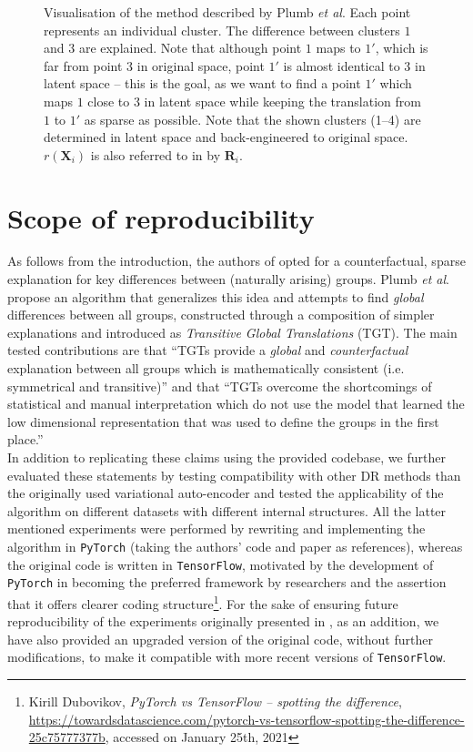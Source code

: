 \begin{figure}[h]
  \scalebox{0.75}{}
  \caption{Visualisation of the method described by Plumb \textit{et al}. Each point represents an individual cluster. The difference between clusters $1$ and $3$ are explained. Note that although point $1$ maps to $1'$, which is far from point $3$ in original space, point $1'$ is almost identical to $3$ in latent space -- this is the goal, as we want to find a point $1'$ which maps $1$ close to $3$ in latent space while keeping the translation from $1$ to $1'$ as sparse as possible. Note that the shown clusters (1--4) are determined in latent space and back-engineered to original space. $r(\boldsymbol{X}_i)$ is also referred to in \cite{plumb2020explaining} by $\boldsymbol{R}_i$.}
\end{figure}

\section{Scope of reproducibility}
As follows from the introduction, the authors of \cite{plumb2020explaining} opted for a counterfactual, sparse explanation for key differences between (naturally arising) groups. Plumb \textit{et al}. propose an algorithm that generalizes this idea and attempts to find \textit{global} differences between all groups, constructed through a composition of simpler explanations and introduced as \textit{Transitive Global Translations} (TGT). The main tested contributions are that ``TGTs provide a \textit{global} and \textit{counterfactual} explanation between all groups which is mathematically consistent (i.e. symmetrical and transitive)'' and that ``TGTs overcome the shortcomings of statistical and manual interpretation which do not use the model that learned the low dimensional representation that was used to define the groups in the first place.''\\

In addition to replicating these claims using the provided codebase, we further evaluated these statements by testing compatibility with other DR methods than the originally used variational auto-encoder and tested the applicability of the algorithm on different datasets with different internal structures. All the latter mentioned experiments were performed by rewriting and implementing the algorithm in \texttt{PyTorch} (taking the authors' code and paper as references), whereas the original code is written in \texttt{TensorFlow}, motivated by the development of \texttt{PyTorch} in becoming the preferred framework by researchers \cite{he2019mlframeworks} and the assertion that it offers clearer coding structure\footnote{Kirill Dubovikov, \textit{PyTorch vs TensorFlow -- spotting the difference}, \url{https://towardsdatascience.com/pytorch-vs-tensorflow-spotting-the-difference-25c75777377b}, accessed on January 25th, 2021}. For the sake of ensuring future reproducibility of the experiments originally presented in \cite{plumb2020explaining}, as an addition, we have also provided an upgraded version of the original code, without further modifications, to make it compatible with more recent versions of \texttt{TensorFlow}.

